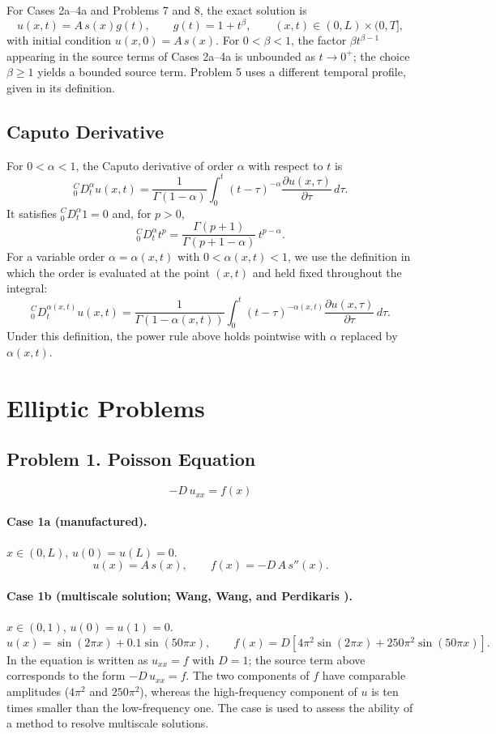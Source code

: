 \documentclass[11pt]{article}
\newcommand{\Caputo}[1]{{}^{C}_{0}D_t^{#1}}
\begin{document}
For Cases 2a--4a and Problems 7 and 8, the exact solution is
\[
u(x,t)=A\,s(x)g(t),
\qquad
g(t)=1+t^\beta,
\qquad
(x,t)\in(0,L)\times(0,T],
\]
with initial condition $u(x,0)=A\,s(x)$. For $0<\beta<1$, the factor
$\beta t^{\beta-1}$ appearing in the source terms of Cases 2a--4a is
unbounded as $t\to0^+$; the choice $\beta\ge1$ yields a bounded source
term. Problem 5 uses a different temporal profile, given in its
definition.

\subsection{Caputo Derivative}

For $0<\alpha<1$, the Caputo derivative of order $\alpha$ with respect to
$t$ is
\[
\Caputo{\alpha}u(x,t)
=
\frac{1}{\Gamma(1-\alpha)}
\int_0^t (t-\tau)^{-\alpha}
\frac{\partial u(x,\tau)}{\partial \tau}\,d\tau .
\]
It satisfies $\Caputo{\alpha}1=0$ and, for $p>0$,
\[
\Caputo{\alpha}t^p
=
\frac{\Gamma(p+1)}{\Gamma(p+1-\alpha)}\,
t^{p-\alpha}.
\]
For a variable order $\alpha=\alpha(x,t)$ with $0<\alpha(x,t)<1$, we use
the definition in which the order is evaluated at the point $(x,t)$ and
held fixed throughout the integral:
\[
\Caputo{\alpha(x,t)}u(x,t)
=
\frac{1}{\Gamma(1-\alpha(x,t))}
\int_0^t (t-\tau)^{-\alpha(x,t)}
\frac{\partial u(x,\tau)}{\partial \tau}\,d\tau .
\]
Under this definition, the power rule above holds pointwise with
$\alpha$ replaced by $\alpha(x,t)$.

\section{Elliptic Problems}

\subsection*{Problem 1. Poisson Equation}

\[
\boxed{-D\,u_{xx}=f(x)}
\]

\paragraph{Case 1a (manufactured).}
$x\in(0,L)$, $u(0)=u(L)=0$.
\[
u(x)=A\,s(x),
\qquad
f(x)=-D\,A\,s''(x).
\]

\paragraph{Case 1b (multiscale solution; Wang, Wang, and Perdikaris \cite{WWP21}).}
$x\in(0,1)$, $u(0)=u(1)=0$.
\[
u(x)=\sin(2\pi x)+0.1\sin(50\pi x),
\qquad
f(x)=D\left[4\pi^2\sin(2\pi x)+250\pi^2\sin(50\pi x)\right].
\]
In \cite{WWP21} the equation is written as $u_{xx}=f$ with $D=1$; the
source term above corresponds to the form $-D\,u_{xx}=f$. The two
components of $f$ have comparable amplitudes ($4\pi^2$ and $250\pi^2$),
whereas the high-frequency component of $u$ is ten times smaller than
the low-frequency one. The case is used to assess the ability of a
method to resolve multiscale solutions.
\end{document}
